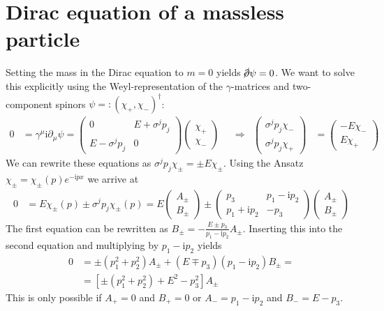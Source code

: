 \documentclass[english, parskip=full]{scrartcl}
\newcommand{\klam}{}
\def\I{\text{i}}
\begin{document}
\section{Dirac equation of a massless particle}
Setting the mass in the Dirac equation to $m=0$ yields $\cancel{\partial}\psi=0$. We want to solve this explicitly using the Weyl-representation of the $\gamma$-matrices and two-component spinors $\psi=:(\chi_+,\chi_-)^\dagger$:
\begin{align*}
0&=\gamma^\mu\I\partial_\mu\psi=\begin{pmatrix}
0&E+\sigma^jp_j \\ E-\sigma^jp_j & 0
\end{pmatrix}\begin{pmatrix}
\chi_+ \\ \chi_-
\end{pmatrix}&&\Rightarrow &\begin{pmatrix}
\sigma^jp_j\chi_- \\ \sigma^jp_j\chi_+
\end{pmatrix}&=\begin{pmatrix}
-E\chi_- \\ E\chi_+
\end{pmatrix}
\end{align*}
We can rewrite these equations as $\sigma^jp_j\chi_\pm=\pm E\chi_\pm$. Using the Ansatz $\chi_\pm=\chi_\pm(p)e^{-\I px}$ we arrive at 
\begin{align*}
0&= E\chi_\pm(p) \pm\sigma^jp_j\chi_\pm(p) =E\begin{pmatrix}
A_\pm \\ B_\pm
\end{pmatrix}\pm\begin{pmatrix}
p_3&p_1-\I p_2 \\ p_1+\I p_2&-p_3
\end{pmatrix}\begin{pmatrix}
A_\pm \\ B_\pm
\end{pmatrix}
\end{align*}
The first equation can be rewritten as $B_\pm=-\frac{E\pm p_3}{p_1-\I p_2}A_\pm$. Inserting this into the second equation and multiplying by $p_1 -\I p_2$ yields
\begin{align*}
0&=\pm(p_1^2+p_2^2)A_\pm +(E\mp p_3)(p_1 -\I p_2) B_\pm =\\
&=\klam\left[ {\pm (p_1^2+p_2^2)+E^2-p_3^2} \right]A_\pm
\end{align*}
This is only possible if $A_+=0$ and  $B_+=0$ or $A_-=p_1-\I p_2$ and $B_-=E-p_3$.
\end{document}
